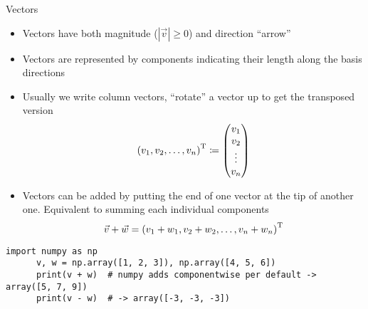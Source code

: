   \begin{frame}[fragile]{Vectors}
    \begin{itemize}
      \item Vectors have both magnitude ($|\vec{v}| \geq 0$) and direction
        \rightarrow \enquote{arrow}
      \item Vectors are represented by components indicating their length
        along the basis directions
      \item Usually we write column vectors,
        \enquote{rotate} a vector up to get the transposed version
        \begin{equation*}
          \left(v_1, v_2, \dots, v_n\right)^{\text{T}} \coloneqq
          \begin{pmatrix} v_1 \\ v_2 \\ \vdots \\ v_n \end{pmatrix}
        \end{equation*}
      \item Vectors can be added by putting the end of one vector at the tip
        of another one. Equivalent to summing each individual components
        \begin{equation*}
          \vec{v} + \vec{w} =
            \left(v_1 + w_1, v_2 + w_2, \dots, v_n + w_n\right)^{\text{T}}
        \end{equation*}
    \end{itemize}
    \begin{mdframed}
      \begin{lstlisting}[style=dark, gobble=6, title=\lsttitlelight{Vectors in numpy -- Examples for presented content}]
      import numpy as np
      v, w = np.array([1, 2, 3]), np.array([4, 5, 6])
      print(v + w)  # numpy adds componentwise per default -> array([5, 7, 9])
      print(v - w)  # -> array([-3, -3, -3])
      \end{lstlisting}
    \end{mdframed}
  \end{frame}

